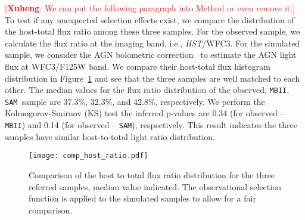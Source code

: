 \documentclass{natureprintstyle}
\newcommand{\hst}{{\it HST}}
\newcommand{\sam}{\texttt{SAM}}
\newcommand{\mbii}{\texttt{MBII}}
\newcommand{\ding}[1]{\textcolor{red}{[{\bf Xuheng}: #1]}}
\begin{document}

 \ding{We can put the following paragraph into Method or even remove it.} To test if any unexpected selection effects exist, we compare the distribution of the host-total flux ratio among these three samples. For the observed sample, we calculate the flux ratio at the imaging band, i.e., \hst/WFC3. For the simulated sample, we consider the AGN bolometric correction~\cite{Elvis1994} to estimate the AGN light flux at WFC3/F125W band. We compare their host-total flux histogram distribution in Figure~\ref{fig:comp_hist} and see that the three samples are well matched to each other. The median values for the flux ratio distribution of the observed, \mbii, \sam\ sample are $37.3\%$, $32.3\%$, and $42.8\%$, respectively. We perform the Kolmogorov-Smirnov (KS) test the inferred p-values are 0.34 (for observed -- \mbii) and 0.14 (for observed -- \sam), respectively. This result indicates the three samples have similar host-to-total light ratio distribution.

\begin{figure}[t]
\texttt{[image: comp\_host\_ratio.pdf]}
\caption{Comparison of the host to total flux ratio distribution for the three referred samples, median value indicated. The observational selection function is applied to the simulated samples to allow for a fair comparison.
}
\label{fig:comp_hist}
\end{figure}
\end{document}
